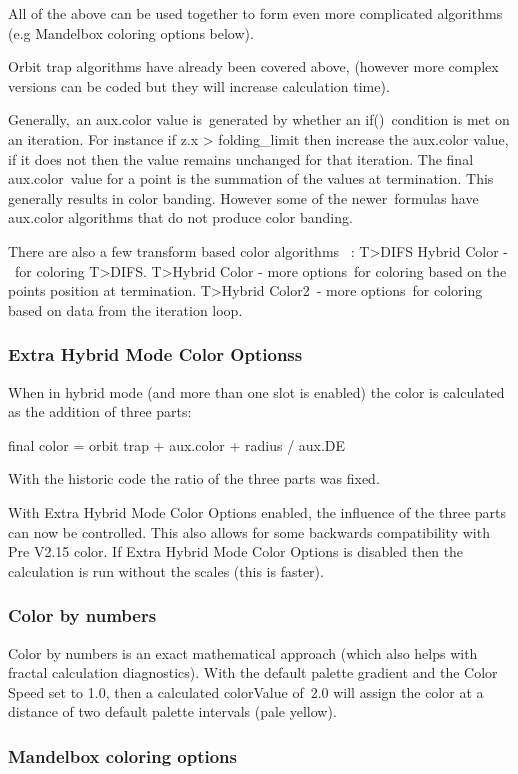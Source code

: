 All of the above can be used together to form even more complicated algorithms (e.g Mandelbox coloring options below).

Orbit trap algorithms have already been covered above, (however more complex versions can be coded but they will increase calculation time).

Generally, an aux.color value is generated by whether an if() condition is met on an iteration. For instance if z.x > folding_limit then increase the aux.color value, if it does not then the value remains unchanged for that iteration. The final aux.color value for a point is the summation of the values at termination. This generally results in color banding. However some of the newer formulas have aux.color algorithms that do not produce color banding.

There are also a few transform based color algorithms  :
T>DIFS Hybrid Color - for coloring T>DIFS.
T>Hybrid Color - more options for coloring based on the points position at termination.
T>Hybrid Color2 - more options for coloring based on data from the iteration loop.

\subsubsection{Extra Hybrid Mode Color Optionss}\label{materials-extra hybrid mode color options}

When in hybrid mode (and more than one slot is enabled) the color is calculated as the addition of three parts:

final color = orbit trap  +  aux.color  +  radius / aux.DE

With the historic code the ratio of the three parts was fixed.

With Extra Hybrid Mode Color Options enabled, the influence of the three parts can now be controlled. This also allows for some backwards compatibility with Pre V2.15 color. If Extra Hybrid Mode Color Options is disabled then the calculation is run without the scales (this is faster).

\subsubsection{Color by numbers}\label{materials-color by numbers}

Color by numbers is an exact mathematical approach (which also helps with fractal calculation diagnostics).
With the default palette gradient and the Color Speed set to 1.0, then a calculated colorValue of 2.0 will assign the color at a distance of two default palette intervals (pale yellow).

\subsubsection{Mandelbox coloring options}\label{materials-mandelbox}








